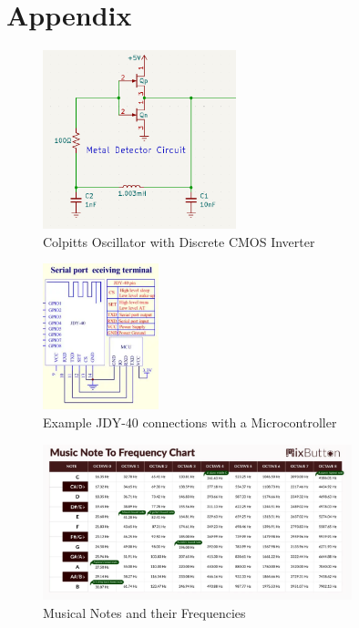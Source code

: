 \documentclass{article}
\begin{document}
\clearpage
\section{Appendix}

\begin{figure}[htbp]
    \centering
    \includegraphics[width=0.5\textwidth]{Figures/metaldetector.png}
    \caption{Colpitts Oscillator with Discrete CMOS Inverter}
    \label{fig:metaldetector}
\end{figure}

\begin{figure}[htbp]
    \centering
    \includegraphics[width=0.3\textwidth]{Figures/jdy40.png}
    \caption{Example JDY-40 connections with a Microcontroller}
    \label{fig:JDY-40}
\end{figure}

\begin{figure}[htbp]
    \centering
    \includegraphics[width=0.8\textwidth]{Figures/Music_Frequencies.png}
    \caption{Musical Notes and their Frequencies}
    \label{fig:music_frequencies}
\end{figure}
\end{document}
